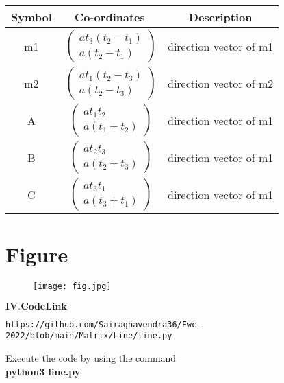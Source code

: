 \documentclass[journal,12pt,twocolumn]{IEEEtran}
\let\vec\mathbf
\begin{document}
\pagebreak\begin{tabular}{|c |c |c|}
    \hline %
      \large\textbf{ Symbol } & \large\textbf{ Co-ordinates } & \large\textbf{Description}\\
      \hline
       \large m1 & $\ \begin{pmatrix} at_3(t_2-t_1)\\ a(t_2-t_1) \end{pmatrix}$ & direction vector of m1 \\
       
       \large m2 & $\ \begin{pmatrix} at_1(t_2-t_3)\\ a(t_2-t_3) \end{pmatrix}$ & direction vector of m2 \\
       
		 \large A & $\ \begin{pmatrix} at_1t_2\\ a(t_1+t_2) \end{pmatrix}$ & direction vector of m1 \\  
		 
		 \large B & $\ \begin{pmatrix} at_2t_3\\ a(t_2+t_3) \end{pmatrix}$ & direction vector of m1 \\  
		 
		 \large C & $\ \begin{pmatrix} at_3t_1\\ a(t_3+t_1) \end{pmatrix}$ & direction vector of m1 \\  
  
      \hline
   \end{tabular}




\section{\textbf{Figure}}
\begin{figure}[h]
    \centering
\texttt{[image: fig.jpg]}
    \label{fig:my_label}
\end{figure}


\begin{center}
$\vec{IV. Code Link}$
\end{center}
\begin{lstlisting}
https://github.com/Sairaghavendra36/Fwc-2022/blob/main/Matrix/Line/line.py
\end{lstlisting}
Execute the code by using the command\\
\textbf{python3 line.py}
\end{document}
